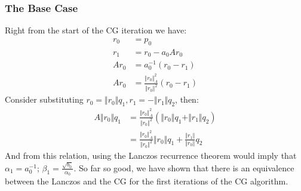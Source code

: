 \documentclass[]{article}
\theoremstyle{definition}
\begin{document}
\begin{appendices}
            \subsubsection{The Base Case}
                Right from the start of the CG iteration we have: 
                \begin{align}
                    r_0 &= p_0
                    \\
                    r_1 &= r_0 - a_0Ar_0
                    \\
                    Ar_0 &= a_0^{-1}(r_0 - r_1)
                    \\
                    Ar_0 &= \frac{\Vert r_0\Vert_A^2}{\Vert r_0\Vert^2}(r_0 - r_1)
                \end{align}
                Consider substituting $r_0 = \Vert r_0\Vert q_1, r_1 = -\Vert r_1\Vert q_2$, then: 
                \begin{align}
                    A\Vert r_0\Vert q_1 
                    &= \frac{\Vert r_0\Vert_A^2}{\Vert r_0\Vert^2}\left(
                        \Vert r_0\Vert q_1 + \Vert r_1\Vert q_2
                    \right)
                    \\
                    &= 
                    \frac{\Vert r_0\Vert_A^2}{\Vert r_0\Vert^2}\Vert r_0\Vert q_1 + 
                        \frac{\Vert r_1\Vert}{\Vert r_0\Vert} q_2
                \end{align}
                And from this relation, using the Lanczos recurrence theorem would imply that $\alpha_1 = a_0^{-1}$; $\beta_1 = \frac{\sqrt{b_0}}{\alpha_0}$. So far so good, we have shown that there is an equivalence between the Lanczos and the CG for the first iterations of the CG algorithm. 

\end{appendices}
\end{document}
